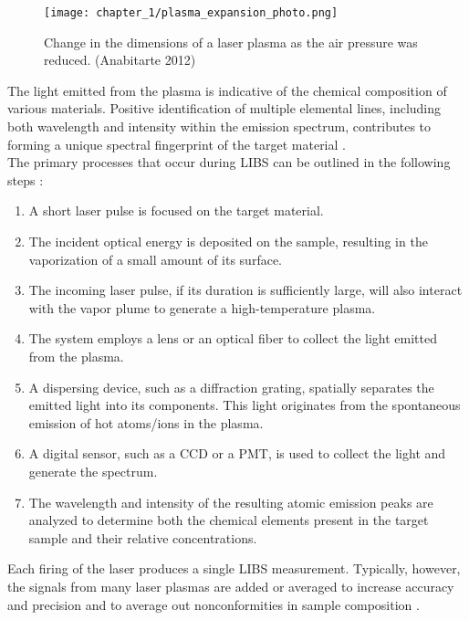 \begin{figure}[H]
    \centering
    \texttt{[image: chapter\_1/plasma\_expansion\_photo.png]}
    \caption[Photo of a plasma expanding.]{ Change in the dimensions of a laser plasma as the air pressure was reduced. (Anabitarte 2012)}
    \label{fig:plasma_expansion}
\end{figure}

The light emitted from the plasma is indicative of the chemical composition of various materials. Positive identification of multiple elemental lines, including both wavelength and intensity within the emission spectrum, contributes to forming a unique spectral fingerprint of the target material \cite{miziolekLaserInducedBreakdown2006}.
\\
The primary processes that occur during LIBS can be outlined in the following steps \cite{ApparatusFundamentals2006}:

\begin{enumerate}
\item A short laser pulse is focused on the target material.
\item The incident optical energy is deposited on the sample, resulting in the vaporization of a small amount of its surface.
\item The incoming laser pulse, if its duration is sufficiently large, will also interact with the vapor plume to generate a high-temperature plasma.
\item The system employs a lens or an optical fiber to collect the light emitted from the plasma.
\item A dispersing device, such as a diffraction grating, spatially separates the emitted light into its components. This light originates from the spontaneous emission of hot atoms/ions in the plasma.
\item A digital sensor, such as a CCD or a PMT, is used to collect the light and generate the spectrum.
\item The wavelength and intensity of the resulting atomic emission peaks are analyzed to determine both the chemical elements present in the target sample and their relative concentrations.
\end{enumerate}
Each firing of the laser produces a single LIBS measurement. Typically, however, the signals from many laser plasmas are added or averaged to increase accuracy and precision and to average out nonconformities in sample composition \cite{miziolekLaserInducedBreakdown2006}.

